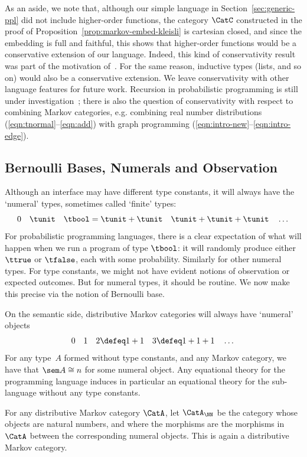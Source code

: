 As an aside, we note that, although our simple language in Section~\ref{sec:generic-ppl} did not include higher-order functions, the category $\CatC$ constructed in the proof of Proposition~\ref{prop:markov-embed-kleisli} is cartesian closed, and since the embedding is full and faithful, this shows that higher-order functions would be a conservative extension of our language. Indeed, this kind of conservativity result was part of the motivation of~\cite{power-universal}.
For the same reason, inductive types (lists, and so on) would also be a conservative extension. 
We leave conservativity with other language features for future work. Recursion in probabilistic programming is still under investigation~\cite{DBLP:conf/lics/JiaLMZ21,DBLP:conf/lics/MatacheMS22,DBLP:journals/pacmpl/VakarKS19,DBLP:journals/corr/abs-2106-16190,DBLP:journals/pacmpl/EhrhardPT18}; there is also the question of conservativity with respect to combining Markov categories, e.g. combining real number distributions (\eqref{eqn:tnormal}--\eqref{eqn:add}) with graph programming (\eqref{eqn:intro-new}--\eqref{eqn:intro-edge}).


\subsection{Bernoulli Bases, Numerals and Observation}\label{sec:bernoulli-base}
Although an interface may have different type constants, it will
always have the `numeral' types, sometimes called `finite' types:
\[
0\quad  \tunit \quad \tbool=\tunit+\tunit \quad \tunit+\tunit+\tunit\quad\dots
\]
For probabilistic programming languages, there is a clear expectation
of what will happen when we run a program of type $\tbool$: it will
randomly produce either $\ttrue$ or $\tfalse$, each with some
probability. Similarly for other
numeral types. For type constants, we might not have evident notions of
observation or expected outcomes. But for numeral types, it should be
routine. We now make this precise via the notion of Bernoulli base. 

On the semantic side, distributive Markov categories will always have `numeral' objects
\[
  0\quad 1\quad 2\defeq1+1\quad 3\defeq 1+1+1\quad\dots
\]
For any type~$A$ formed without type constants, and any Markov
category, we have
that $\sem A\cong n$ for some numeral object.
Any equational theory for the programming language induces in
particular an equational theory for the sub-language without any type
constants.

\begin{proposition}
  For any distributive Markov category $\CatA$, let $\CatA_\NN$ be the category whose objects are natural numbers, and where the morphisms are the morphisms in $\CatA$ between the corresponding numeral objects.
  This
  is again a distributive Markov category.
\end{proposition}

